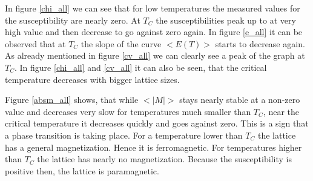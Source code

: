 \documentclass[10pt,a4paper]{article}
\begin{document}
In figure \ref{chi_all} we can see that for low temperatures the measured values for the susceptibility are nearly zero. At $T_C$ the susceptibilities peak up to at very high value and then decrease to go against zero again. In figure \ref{e_all} it can be observed that at $T_C$ the slope of the curve $<E(T)>$ starts to decrease again. As already mentioned in figure \ref{cv_all} we can clearly see a peak of the graph at $T_C$. In figure \ref{chi_all} and \ref{cv_all} it can also be seen, that the critical temperature decreases with bigger lattice sizes. 

Figure \ref{absm_all} shows, that while $<|M|>$ stays nearly stable at a non-zero value and decreases very slow for temperatures much smaller than $T_C$, near the critical temperature it decreases quickly and goes against zero. This is a sign that a phase transition is taking place. For a temperature lower than $T_C$ the lattice has a general magnetization. Hence it is ferromagnetic. For temperatures higher than $T_C$ the lattice has nearly no magnetization. Because the susceptibility is positive then, the  lattice is paramagnetic.
\end{document}

